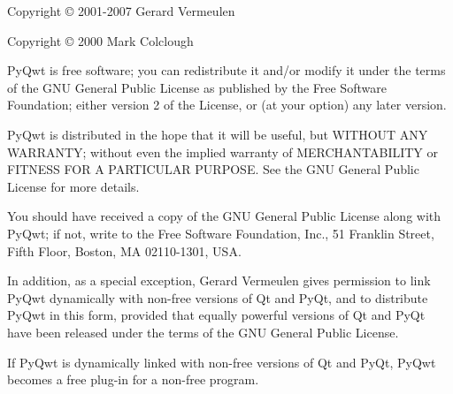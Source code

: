 Copyright \copyright{} 2001-2007 Gerard Vermeulen

Copyright \copyright{} 2000 Mark Colclough

PyQwt is free software; you can redistribute it and/or modify
it under the terms of the GNU General Public License as published by
the Free Software Foundation; either version 2 of the License, or
(at your option) any later version.

PyQwt is distributed in the hope that it will be useful,
but WITHOUT ANY WARRANTY; without even the implied warranty of
MERCHANTABILITY or FITNESS FOR A PARTICULAR PURPOSE.  See the
GNU General Public License for more details.

You should have received a copy of the GNU General Public License along
with PyQwt; if not, write to the Free Software Foundation, Inc.,
51 Franklin Street, Fifth Floor, Boston, MA  02110-1301, USA.

In addition, as a special exception, Gerard Vermeulen gives permission
to link PyQwt dynamically with non-free versions of Qt and PyQt,
and to distribute PyQwt in this form, provided that equally powerful
versions of Qt and PyQt have been released under the terms of the GNU
General Public License.

If PyQwt is dynamically linked with non-free versions of Qt and PyQt,
PyQwt becomes a free plug-in for a non-free program.



